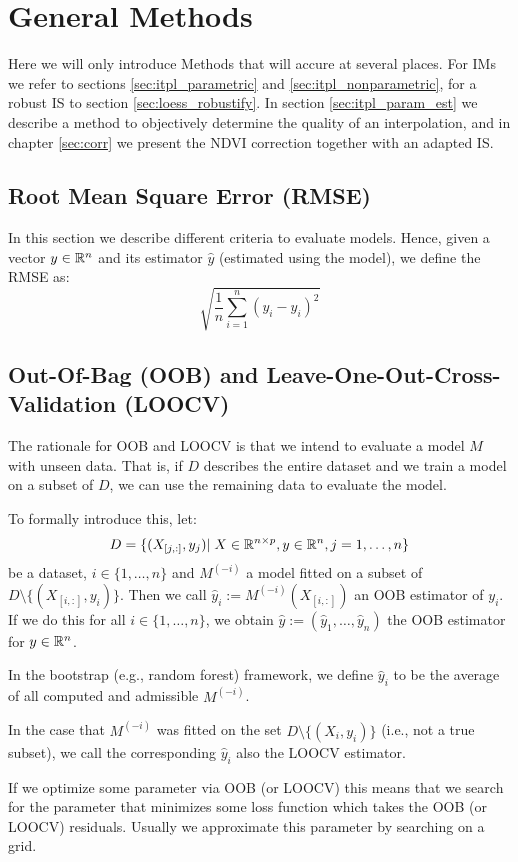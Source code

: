 \section{General Methods}{\label{sec:general_methods}
	Here we will only introduce Methods that will accure at several places. For {{IM}}s we refer to sections \ref{sec:itpl_parametric} and \ref{sec:itpl_nonparametric}, for a robust {{IS}} to section \ref{sec:loess_robustify}. In section \ref{sec:itpl_param_est} we describe a method to objectively determine the quality of an interpolation, and in chapter \ref{sec:corr} we present the NDVI correction together with an adapted {{IS}}.


	\subsection{Root Mean Square Error (RMSE)}
		In this section we describe different criteria to evaluate models. Hence, given a vector $y\in \mathbb{R}^n$ and its estimator $\hat y$ (estimated using the model), we define the RMSE as:
		\begin{equation}
			\label{eq:rmse}
			 \sqrt{\frac{1}{n}\sum_{i=1}^n (y_i - \hat y_i)^2}
		\end{equation}
		
		\subsection{Out-Of-Bag ({OOB}) and Leave-One-Out-Cross-Validation ({LOOCV})}{ \label{sec:OOB_LOOCV}
		The rationale for OOB and LOOCV is that we intend to evaluate a model $M$ with unseen data. That is, if $D$ describes the entire dataset and we train a model on a subset of $D$, we can use the remaining data to evaluate the model. 
		
		To formally introduce this, let:
		$$
			D=\{(X_{[j,:]},y_j)|\; X\in\mathbb{R}^{n\times p}, y\in \mathbb{R}^n, j=1,\dots,n\}
		$$
		be a dataset, $i\in \{1,\dots,n\}$ and $M^{(-i)}$ a model fitted on a subset of $D\setminus\{(X_{[i,:]},y_i)\}$. Then we call $\hat y_i:= M^{(-i)}(X_{[i,:]})$ an {OOB} estimator of $y_i$. If we do this for all $i\in\{1,\dots,n\}$, we obtain $\hat y := \left(\hat y_1,\dots,\hat y_n\right)$ the OOB estimator for $y\in \mathbb{R}^n$.

		In the bootstrap (e.g., random forest) framework, we define $\hat y_i$ to be the average of all computed and admissible $M^{(-i)}$. 
		
		In the case that $M^{(-i)}$ was fitted on the set $D\setminus\{(X_i,y_i)\}$ (i.e., not a true subset), we call the corresponding $\hat y_i$ also the LOOCV estimator.	

		If we optimize some parameter via OOB (or LOOCV) this means that we search for the parameter that minimizes some loss function which takes the OOB (or LOOCV) residuals. Usually we approximate this parameter by searching on a grid. 
	}

}

